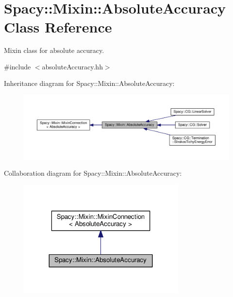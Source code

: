 \hypertarget{classSpacy_1_1Mixin_1_1AbsoluteAccuracy}{}\section{Spacy\+:\+:Mixin\+:\+:Absolute\+Accuracy Class Reference}
\label{classSpacy_1_1Mixin_1_1AbsoluteAccuracy}


Mixin class for absolute accuracy.  




{\ttfamily \#include $<$absolute\+Accuracy.\+hh$>$}



Inheritance diagram for Spacy\+:\+:Mixin\+:\+:Absolute\+Accuracy\+:\nopagebreak
\begin{figure}[H]
\begin{center}
\leavevmode
\includegraphics[width=350pt]{classSpacy_1_1Mixin_1_1AbsoluteAccuracy__inherit__graph}
\end{center}
\end{figure}


Collaboration diagram for Spacy\+:\+:Mixin\+:\+:Absolute\+Accuracy\+:\nopagebreak
\begin{figure}[H]
\begin{center}
\leavevmode
\includegraphics[width=239pt]{classSpacy_1_1Mixin_1_1AbsoluteAccuracy__coll__graph}
\end{center}
\end{figure}
